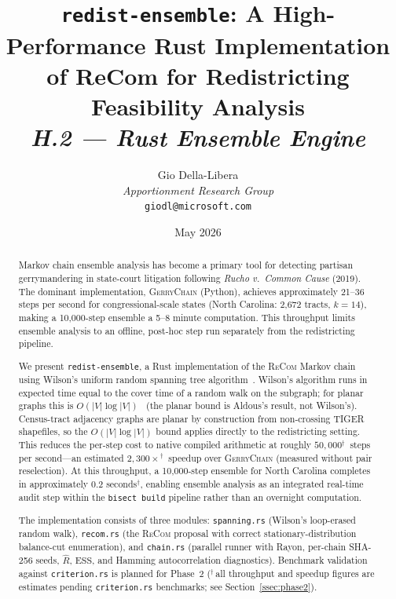\documentclass[12pt]{article}
\title{%
  \textbf{\texttt{redist-ensemble}: A High-Performance Rust Implementation}\\
  \textbf{of ReCom for Redistricting Feasibility Analysis}\\[0.8em]
  \normalsize\textit{H.2 --- Rust Ensemble Engine}%
}
\author{%
  Gio Della-Libera\\
  \textit{Apportionment Research Group}\\
  \small\texttt{giodl@microsoft.com}
}
\date{May 2026}
\newcommand{\gc}{\textsc{GerryChain}}
\newcommand{\recom}{\textsc{ReCom}}
\newcommand{\rhat}{\ensuremath{\hat{R}}}
\newcommand{\ess}{\mathrm{ESS}}
\newcommand{\est}{$^{\dagger}$}
\begin{document}
\maketitle

\begin{abstract}
\noindent
Markov chain ensemble analysis has become a primary tool for detecting
partisan gerrymandering in state-court litigation following
\textit{Rucho v.\ Common Cause} (2019).
The dominant implementation, \gc{} (Python), achieves approximately
21--36 steps per second for congressional-scale states
(North Carolina: 2{,}672 tracts, $k=14$), making a 10{,}000-step
ensemble a 5--8 minute computation.
This throughput limits ensemble analysis to an offline, post-hoc step
run separately from the redistricting pipeline.

We present \texttt{redist-ensemble}, a Rust implementation of the
\recom{} Markov chain using Wilson's uniform random spanning tree
algorithm~\citep{wilson1996generating}.
Wilson's algorithm runs in expected time equal to the cover time of
a random walk on the subgraph; for planar graphs this is
$O(|V|\log|V|)$~\citep{aldous1991random} (the planar bound is
Aldous's result, not Wilson's).
Census-tract adjacency graphs are planar by construction from
non-crossing TIGER shapefiles, so the $O(|V|\log|V|)$ bound applies
directly to the redistricting setting.
This reduces the per-step cost to native
compiled arithmetic at roughly $50{,}000$\est\ steps per
second---an estimated $2{,}300\times$\est\ speedup over \gc{}
(measured without pair reselection).
At this throughput, a 10{,}000-step ensemble for North Carolina completes
in approximately 0.2 seconds\est, enabling ensemble analysis as an
integrated real-time audit step within the \texttt{bisect build}
pipeline rather than an overnight computation.

The implementation consists of three modules: \texttt{spanning.rs}
(Wilson's loop-erased random walk), \texttt{recom.rs} (the \recom{}
proposal with correct stationary-distribution balance-cut enumeration),
and \texttt{chain.rs} (parallel runner with Rayon, per-chain SHA-256
seeds, $\rhat$, $\ess$, and Hamming autocorrelation diagnostics).
Benchmark validation against \texttt{criterion.rs} is planned for Phase~2
(\est\,all throughput and speedup figures are estimates pending
\texttt{criterion.rs} benchmarks; see Section~\ref{ssec:phase2}).
\end{abstract}

\tableofcontents
\newpage











\end{document}
